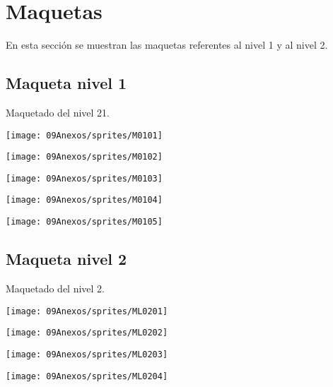 \section{Maquetas}
En esta sección se muestran las maquetas referentes al nivel 1 y al nivel 2.

\subsection{Maqueta nivel 1}\label{Mac01}
Maquetado del nivel 21.
\begin{center}
\texttt{[image: 09Anexos/sprites/M0101]}
\end{center}

\begin{center}
\texttt{[image: 09Anexos/sprites/M0102]}
\end{center}

\begin{center}
\texttt{[image: 09Anexos/sprites/M0103]}
\end{center}

\begin{center}
\texttt{[image: 09Anexos/sprites/M0104]}
\end{center}

\begin{center}
\texttt{[image: 09Anexos/sprites/M0105]}
\end{center}


\subsection{Maqueta nivel 2}\label{Mac02}
Maquetado del nivel 2.
\begin{center}
\texttt{[image: 09Anexos/sprites/ML0201]}
\end{center}

\begin{center}
\texttt{[image: 09Anexos/sprites/ML0202]}
\end{center}

\begin{center}
\texttt{[image: 09Anexos/sprites/ML0203]}
\end{center}

\begin{center}
\texttt{[image: 09Anexos/sprites/ML0204]}
\end{center}

